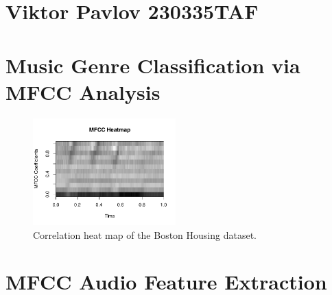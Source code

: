\documentclass[twocolumn]{article}
\author{Name Surname }
\begin{document}
\section*{Viktor Pavlov 230335TAF}
\section{Music Genre Classification via MFCC Analysis}
\begin{figure}[hht]
\centering
\includegraphics[width=0.49\textwidth]{images/mfcc_heatmap_8.pdf}
\caption{Correlation heat map of the Boston Housing dataset.}
\label{fig:corr}
\end{figure}

\blindtext

\section{MFCC Audio Feature Extraction}

\blindtext
\end{document}
